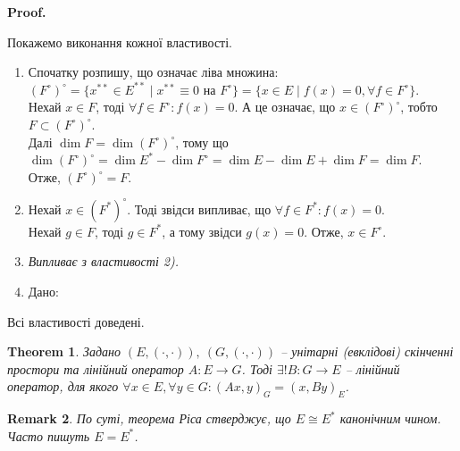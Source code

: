 \documentclass[a4paper, 10pt]{article}
\makeatletter
\theoremstyle{theoremdd}
\newtheorem{theorem}{Theorem}[subsection]
\newtheorem{remark}[theorem]{Remark}
\renewenvironment{proof}[1][Proof.\\]{\par
\pushQED{\hfill \qed}%
\normalfont \topsep6\p@\@plus6\p@\relax
\trivlist
\item\relax
{\bfseries
#1\@addpunct{.}}\hspace\labelsep\ignorespaces
}{%
\popQED\endtrivlist\@endpefalse
}
\makeatother
\begin{document}
\begin{proof}
Покажемо виконання кожної властивості.
\begin{enumerate}[topsep=-\parskip, wide=0pt, label={\arabic*)}]
\item Спочатку розпишу, що означає ліва множина:\\
$(F^\circ)^\circ = \{ x^{**} \in E^{**} \mid x^{**} \equiv 0 \text{ на } F^\circ \} = \{x \in E \mid f(x) = 0, \forall f \in F^\circ\}$.\\
Нехай $x \in F$, тоді $\forall f \in F^\circ : f(x) = 0$. А це означає, що $x \in (F^\circ)^\circ$, тобто $F \subset (F^\circ)^\circ$.\\
Далі $\dim F = \dim (F^\circ)^\circ$, тому що $\dim (F^{\circ})^\circ = \dim E^* - \dim F^\circ = \dim E - \dim E + \dim F = \dim F$.\\
Отже, $(F^{\circ})^{\circ} = F$.
\item Нехай $x \in (F^*)^\circ$. Тоді звідси випливає, що $\forall f \in F^*: f(x) = 0$.\\
Нехай $g \in F$, тоді $g \in F^*$, а тому звідси $g(x) = 0$. Отже, $x \in F^\circ$.
\item \textit{Випливає з властивості 2).}
\item Дано:
\end{enumerate}
Всі властивості доведені.
\end{proof}
\fi

\begin{theorem} Задано $(E,(\cdot,\cdot)),\ (G,(\cdot,\cdot))$ -- унітарні (евклідові) скінченні простори та лінійний оператор $A \colon E \to G$. Тоді $\exists! B \colon G \to E$ -- лінійний оператор, для якого $\forall x \in E, \forall y \in G: (Ax,y)_G = (x,By)_E$.
\end{theorem}

\begin{remark}
По суті, теорема Ріса стверджує, що $E \cong E^*$ канонічним чином. Часто пишуть $E = E^*$.
\end{remark}
\end{document}
